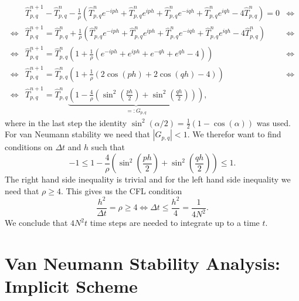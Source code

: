 \documentclass[a4aper,pagesize]{scrartcl}
\theoremstyle{definition}
\theoremstyle{plain}
\theoremstyle{remark}
\renewcommand{\hat}{\widehat}
\begin{document}
\begin{align*}
	  &\hat{T}^{n+1}_{p,q}
	- \hat{T}^{n}_{p,q}
	-\frac{1}{\rho} \left(
		  \hat{T}^{n}_{p,q} e^{-iph}
		+ \hat{T}^{n}_{p,q} e^{iph}
	    + \hat{T}^{n}_{p,q} e^{-iqh}
		+ \hat{T}^{n}_{p,q} e^{iqh}
		-  4 \hat{T}^{n}_{p,q}
	\right)= 0
&\Leftrightarrow\\
\Leftrightarrow
	  &\hat{T}^{n+1}_{p,q} =
      \hat{T}^{n}_{p,q}
	 +\frac{1}{\rho} \left(
		  \hat{T}^{n}_{p,q} e^{-iph}
		+ \hat{T}^{n}_{p,q} e^{iph}
	    + \hat{T}^{n}_{p,q} e^{-iqh}
		+ \hat{T}^{n}_{p,q} e^{iqh}
		-  4 \hat{T}^{n}_{p,q}
	\right)
&\Leftrightarrow\\
\Leftrightarrow
	  &\hat{T}^{n+1}_{p,q} =
      \hat{T}^{n}_{p,q}\left(
      1
	 +\frac{1}{\rho} \left(
		  e^{-iph}
		+ e^{iph}
	    + e^{-qh}
		+ e^{qh}
		-  4
	    \right)
	\right)
&\Leftrightarrow\\
\Leftrightarrow
	  &\hat{T}^{n+1}_{p,q} =
      \hat{T}^{n}_{p,q}\left(
      1
	 +\frac{1}{\rho} \left(
		  2\cos(ph)
	    + 2\cos(qh)
	    - 4
	    \right)
	\right)
&\Leftrightarrow\\
\Leftrightarrow
	  &\hat{T}^{n+1}_{p,q} =
      \hat{T}^{n}_{p,q}\underbrace{\left(
      1
	 -\frac{4}{\rho} \left(
	      \sin^2\left(\frac{ph}{2}\right)
	    + \sin^2\left(\frac{qh}{2}\right)
	    \right)
	  \right)}_{=:G_{p,q}},
\end{align*}
where in the last step the identity $\sin^2(\alpha/2) = \frac{1}{2}(1-\cos(\alpha))$ was used. For van Neumann stability we need that $|G_{p,q}|<1$. We therefor want to find conditions on $\Delta t$ and $h$ such that
\begin{equation}
-1 \le
	1-\frac{4}{\rho} \left(
		  \sin^2\left(\frac{ph}{2}\right)
	    + \sin^2\left(\frac{qh}{2}\right)
	\right)
	\le 1.
\end{equation}
The right hand side inequality is trivial and for the left hand side inequality we need that $\rho \geq 4$. This gives us the CFL condition
\begin{equation}
	\frac{h^2}{\Delta t} = \rho \geq 4 \Leftrightarrow \Delta t \leq \frac{h^2}{4} = \frac{1}{4N^2}.
\end{equation}
We conclude that $4N^2t$ time steps are needed to integrate up to a time $t$.


\section{Van Neumann Stability Analysis: Implicit Scheme}
\end{document}
